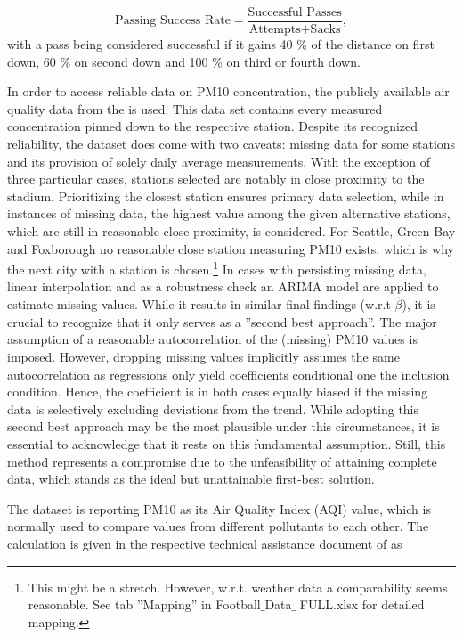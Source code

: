 \documentclass[12pt,a4paper]{article}
\begin{document}
\begin{equation}
\textrm{Passing Success Rate} = \dfrac{\textrm{Successful Passes}}{\textrm{Attempts} + \textrm{Sacks}},
\end{equation}
with a pass being considered successful if it gains 40 \% of the distance on first down, 60 \% on second down and 100 \% on third or fourth down. 

In order to access reliable data on PM10 concentration, the publicly available air quality data from the \citeauthor{EPA} is used. This data set contains every measured concentration pinned down to the respective station. Despite its recognized reliability, the \citeauthor{EPA} dataset does come with two caveats: missing data for some stations and its provision of solely daily average measurements. With the exception of three particular cases, stations selected are notably in close proximity to the stadium. Prioritizing the closest station ensures primary data selection, while in instances of missing data, the highest value among the given alternative stations, which are still in reasonable close proximity, is considered. For Seattle, Green Bay and Foxborough no reasonable close station measuring PM10 exists, which is why the next city with a station is chosen.\footnote{This might be a stretch. However, w.r.t. weather data a comparability seems reasonable. See tab ''Mapping'' in Football$\_$Data$\_$ FULL.xlsx for detailed mapping.}
In cases with persisting missing data, linear interpolation and as a robustness check an ARIMA model are applied to estimate missing values. While it results in similar final findings (w.r.t $\hat{\beta}$), it is crucial to recognize that it only serves as a ''second best approach''. The major assumption of a reasonable autocorrelation of the (missing) PM10 values is imposed. However, dropping missing values implicitly assumes the same autocorrelation as regressions only yield coefficients conditional one the inclusion condition. Hence, the coefficient is in both cases equally biased if the missing data is selectively excluding deviations from the trend. While adopting this second best approach may be the most plausible under this circumstances, it is essential to acknowledge that it rests on this fundamental assumption. Still, this method represents a compromise due to the unfeasibility of attaining complete data, which stands as the ideal but unattainable first-best solution.

The \citeauthor{EPA} dataset is reporting PM10 as its Air Quality Index (AQI) value, which is normally used to compare values from different pollutants to each other. The calculation is given in the respective technical assistance document of \citeauthor{EPA} as 
\end{document}
